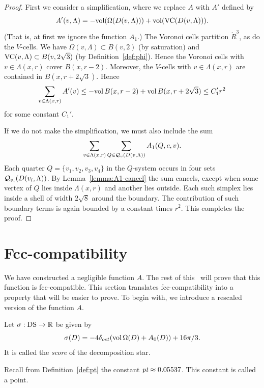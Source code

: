 \begin{proof} First we consider a simplification, where we replace
   $A$ with $A'$ defined by
      $$
      A'(v,\Lambda) = -{\operatorname{vol}}(\Omega(D(v,\Lambda)))+
         {\operatorname{vol}}({\operatorname{VC}}(D(v,\Lambda))).$$
(That is, at first we ignore the function $A_1$.) The Voronoi
cells partition $\ring{R}^3$, as do the $V$-cells.  We have
$\Omega(v,\Lambda)\subset B(v,2)$ (by saturation) and
${\operatorname{VC}}(v,\Lambda)\subset B(v,2\sqrt3)$ (by
Definition~\ref{def:phi}). Hence the Voronoi cells with $v\in
\Lambda(x,r)$ cover $B(x,r-2)$. Moreover, the $V$-cells with $v\in
\Lambda(x,r)$ are contained in $B(x,r+2\sqrt3)$.  Hence
   $$
   \sum_{v\in\Lambda(x,r)} A'(v) \le -{\operatorname{vol}}\,B(x,r-2)
      +{\operatorname{vol}}\,B(x,r+2\sqrt3)\le C_1' r^2
   $$
for some constant $C_1'$.

If we do not make the simplification, we must also include the sum
   $$\sum_{v\in\Lambda(x,r)} \sum_{Q\in{\mathcal Q}_v(D(v,\Lambda))}
      A_1 (Q,c,v).$$
Each quarter $Q=\{v_1,v_2,v_3,v_4\}$ in the $Q$-system occurs in
four sets ${\mathcal Q}_{v_i}(D(v_i,\Lambda))$.  By
Lemma~\ref{lemma:A1-cancel} the sum cancels, except when some
vertex of $Q$ lies inside $\Lambda(x,r)$ and another lies outside.
Each such simplex lies inside a shell of width $2\sqrt8$ around
the boundary.  The contribution of such boundary terms is again
bounded by a constant times $r^2$.  This completes the proof.
\end{proof}


\section{Fcc-compatibility}

We have constructed a negligible function $A$.  The rest of this
\paper\ will prove that this function is fcc-compatible.   This
section translates fcc-compatibility into a property that will be
easier to prove.  To begin with, we introduce a rescaled version
of the function $A$.

\begin{definition}\label{def:score}
Let $\sigma:{\operatorname{DS}}\to\mathbb{R}$ be given by
   $$\sigma(D) = -4\delta_{oct} ({\operatorname{vol}}\,\Omega(D) + A_0(D)) +
   16\pi/3.$$
It is called the {\it score} of the decomposition star.
%
\end{definition}

Recall from Definition~\ref{def:pt} the constant $\hbox{\it pt}\approx
0.05537$.  This constant is called a point.

